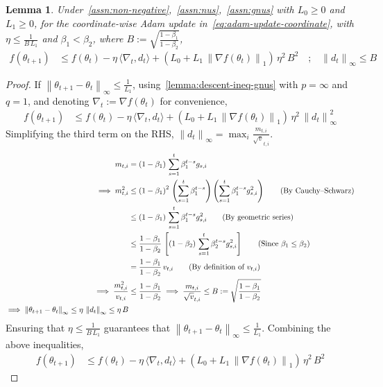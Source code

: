 \documentclass{article}
\newtheorem{lemma}{Lemma}
\newcommand{\ti}[1]{#1_{t,i}}
\newcommand{\si}[1]{#1_{s,i}}
\newcommand{\normsq}[1]{\left\|#1 \right\|^{2}}
\newcommand{\norm}[1]{\left\|#1 \right\|}
\newcommand{\tht}{\theta_t}
\newcommand{\thtt}{\theta_{t+1}}
\begin{document}
\begin{lemma}
Under~\cref{assn:non-negative},~\cref{assn:nus},~\cref{assn:gnus} with $L_0 \geq 0$ and $L_1 \geq 0$, for the coordinate-wise Adam update in~\cref{eq:adam-update-coordinate}, with $\eta \leq \frac{1}{B \, L_1}$ and $\beta_1 < \beta_2$, where $B := \sqrt{\frac{1 - \beta_1}{1 - \beta_2}} $, 
\begin{align*}
f(\thtt) & \leq f(\tht) - \eta \, \langle \nabla_t, d_t \rangle +  \left(L_0 + L_1 \, \norm{\nabla f(\tht)}_1 \right) \, \eta^2 \, B^2 \quad \text{;} \quad \norm{d_t}_\infty \leq B
\end{align*}   
\label{lemma:adam-descent-gnus}
\end{lemma}
\begin{proof}
If $\norm{\thtt - \tht}_\infty \leq \frac{1}{L_1}$, using~\cref{lemma:descent-ineq-gnus} with $p = \infty$ and $q = 1$, and denoting $\nabla_t := \nabla f(\tht)$ for convenience,
\begin{align*}
f(\thtt) & \leq f(\tht) - \eta \, \langle \nabla_t, d_t \rangle + \left(L_0 + L_1 \, \norm{\nabla f(\tht)}_1 \right) \, \eta^2 \, \normsq{d_t}_\infty
\end{align*}
Simplifying the third term on the RHS, $\norm{d_t}_\infty = \max_{i} \frac{\ti{m}}{\ti{\sqrt{v}}}$. 
\begin{align}
\ti{m} & = (1-\beta_1) \, \sum_{s = 1}^{t} \beta_1^{t-s} \si{g} \\
\implies \ti{m^2} & \leq \left(1-\beta_1\right)^2 \, \left(\sum_{s = 1}^{t} \beta_1^{t-s}\right) \left(\sum_{s = 1}^{t} \beta_1^{t-s} \si{g^2} \right) \tag{By Cauchy--Schwarz} \\
& \leq \left(1-\beta_1\right) \, \sum_{s = 1}^{t} \beta_1^{t-s} \si{g^2} \tag{By geometric series} \\
& \leq \frac{1 - \beta_1}{1 - \beta_2} \, \left[\left(1-\beta_2\right) \, \sum_{s = 1}^{t} \beta_2^{t-s} \si{g^2} \right] \tag{Since $\beta_1 \leq \beta_2$} \\
&= \frac{1 - \beta_1}{1 - \beta_2} \, \ti{v} \tag{By definition of $\ti{v}$} \\
\implies \frac{\ti{m^2}}{\ti{v}} & \leq \frac{1 - \beta_1}{1 - \beta_2}  \implies  \frac{\ti{m}}{\ti{\sqrt{v}}} \leq B := \sqrt{\frac{1 - \beta_1}{1 - \beta_2} } \\
\implies \norm{\thtt - \tht}_\infty \leq \eta \, \norm{d_t}_\infty \leq \eta \, B \label{eq:adam-1pl-thirdterm-gnus}
\end{align}
Ensuring that $\eta \leq \frac{1}{B \, L_1}$ guarantees that $\norm{\thtt - \tht}_\infty \leq \frac{1}{L_1}$. Combining the above inequalities, 
\begin{align}
f(\thtt) & \leq f(\tht) - \eta \, \langle \nabla_t, d_t \rangle +  \left(L_0 + L_1 \, \norm{\nabla f(\tht)}_1 \right) \, \eta^2 \, B^2 
\end{align}    
\end{proof}
\end{document}

